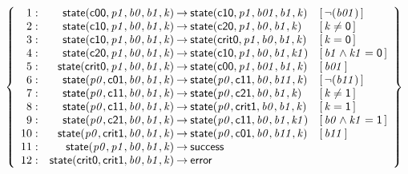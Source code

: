 \documentclass[a4paper]{article}
\newcommand{\symb}[1]{\mathsf{#1}}
\newcommand{\var}[1]{\mathit{#1}}
\newcommand{\Constraint}[1]{[\, #1 \,]}
\begin{document}
\[
\left\{
\begin{array}{rr@{\>}c@{\>}ll}
\mathrm{1} : 
 & \symb{state}(\symb{c00},\var{p1},\var{b0},\var{b1},\var{k})
 & \to 
 & \symb{state}(\symb{c10},\var{p1},\var{b01},\var{b1},\var{k})
 & \Constraint{\neg(\var{b01})}\\

\mathrm{2} : 
 & \symb{state}(\symb{c10},\var{p1},\var{b0},\var{b1},\var{k})
 & \to 
 & \symb{state}(\symb{c20},\var{p1},\var{b0},\var{b1},\var{k})
 & \Constraint{\var{k} \ne \symb{0}}\\

\mathrm{3} : 
 & \symb{state}(\symb{c10},\var{p1},\var{b0},\var{b1},\var{k})
 & \to 
 & \symb{state}(\symb{crit0},\var{p1},\var{b0},\var{b1},\var{k})
 & \Constraint{\var{k} = \symb{0}}\\

\mathrm{4} : 
 & \symb{state}(\symb{c20},\var{p1},\var{b0},\var{b1},\var{k})
 & \to 
 & \symb{state}(\symb{c10},\var{p1},\var{b0},\var{b1},\var{k1})
 & \Constraint{\var{b1} \land \var{k1} = \symb{0}}\\

\mathrm{5} : 
 & \symb{state}(\symb{crit0},\var{p1},\var{b0},\var{b1},\var{k})
 & \to 
 & \symb{state}(\symb{c00},\var{p1},\var{b01},\var{b1},\var{k})
 & \Constraint{\var{b01}}\\

\mathrm{6} : 
 & \symb{state}(\var{p0},\symb{c01},\var{b0},\var{b1},\var{k})
 & \to 
 & \symb{state}(\var{p0},\symb{c11},\var{b0},\var{b11},\var{k})
 & \Constraint{\neg(\var{b11})}\\

\mathrm{7} : 
 & \symb{state}(\var{p0},\symb{c11},\var{b0},\var{b1},\var{k})
 & \to 
 & \symb{state}(\var{p0},\symb{c21},\var{b0},\var{b1},\var{k})
 & \Constraint{\var{k} \ne \symb{1}}\\

\mathrm{8} : 
 & \symb{state}(\var{p0},\symb{c11},\var{b0},\var{b1},\var{k})
 & \to 
 & \symb{state}(\var{p0},\symb{crit1},\var{b0},\var{b1},\var{k})
 & \Constraint{\var{k} = \symb{1}}\\

\mathrm{9} : 
 & \symb{state}(\var{p0},\symb{c21},\var{b0},\var{b1},\var{k})
 & \to 
 & \symb{state}(\var{p0},\symb{c11},\var{b0},\var{b1},\var{k1})
 & \Constraint{\var{b0} \land \var{k1} = \symb{1}}\\

\mathrm{10} : 
 & \symb{state}(\var{p0},\symb{crit1},\var{b0},\var{b1},\var{k})
 & \to 
 & \symb{state}(\var{p0},\symb{c01},\var{b0},\var{b11},\var{k})
 & \Constraint{\var{b11}}\\

\mathrm{11} : 
 & \symb{state}(\var{p0},\var{p1},\var{b0},\var{b1},\var{k})
 & \to 
 & \symb{success}\\

\mathrm{12} : 
 & \symb{state}(\symb{crit0},\symb{crit1},\var{b0},\var{b1},\var{k})
 & \to 
 & \symb{error}\\

\end{array}
\right\}
\]
\end{document}
